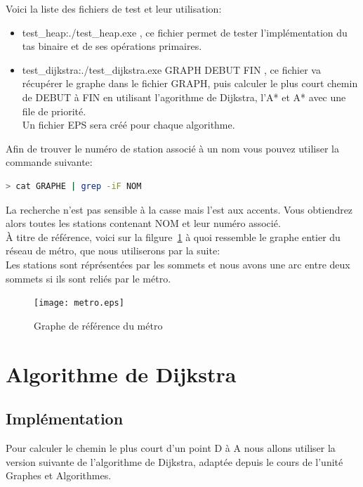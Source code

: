 \documentclass{article}
\begin{document}
Voici la liste des fichiers de test et leur utilisation:
\begin{itemize}
	\item test\_heap:./test\_heap.exe , ce fichier permet de tester l'implémentation du tas
		  binaire et de ses opérations primaires.
	\item test\_dijkstra:./test\_dijkstra.exe GRAPH DEBUT FIN , ce fichier va récupérer
		  le graphe dans le fichier GRAPH, puis calculer le plus court chemin de DEBUT à FIN
		  en utilisant l'agorithme de Dijkstra, l'A* et A* avec une file de priorité.\\
		  Un fichier EPS sera créé pour chaque algorithme.\\
\end{itemize}

Afin de trouver le numéro de station associé à un nom vous pouvez utiliser la commande suivante:
\begin{lstlisting}[language=bash]
	> cat GRAPHE | grep -iF NOM
\end{lstlisting}
La recherche n'est pas sensible à la casse mais l'est aux accents. Vous obtiendrez alors
toutes les stations contenant NOM et leur numéro associé.\\

À titre de référence, voici sur la filgure~\ref{metro} à quoi ressemble le graphe entier du réseau de métro, que nous
utiliserons par la suite:\\
Les stations sont réprésentées par les sommets et nous avons une arc entre deux sommets
si ils sont reliés par le métro.

\begin{figure}[!hbt]
	\centering
	\texttt{[image: metro.eps]}
	\caption{Graphe de référence du métro}
	\label{metro}
\end{figure}

\clearpage
\section{Algorithme de Dijkstra}
\subsection{Implémentation}

Pour calculer le chemin le plus court d'un point D à A nous allons utiliser 
la version suivante de l'algorithme de Dijkstra, adaptée depuis le cours de 
l'unité Graphes et Algorithmes.\\
\end{document}
